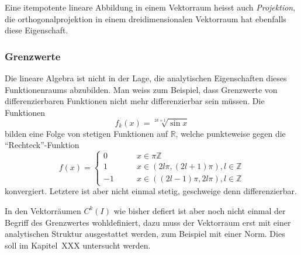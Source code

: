 Eine itempotente lineare Abbildung in einem Vektorraum heisst auch
{\em Projektion},
%
die orthogonalprojektion in einem dreidimensionalen Vektorraum hat
ebenfalls diese Eigenschaft.

\subsubsection{Grenzwerte}
Die lineare Algebra ist nicht in der Lage, die analytischen Eigenschaften
dieses Funktionenraums abzubilden.
Man weiss zum Beispiel, dass Grenzwerte von differenzierbaren Funktionen
nicht mehr differenzierbar sein müssen.
Die Funktionen 
\[
f_k(x) = \sqrt[2k+1]{\sin x}
\]
bilden eine Folge von stetigen Funktionen auf $\mathbb R$, welche
punkteweise gegen die ``Rechteck''-Funktion
\[
f(x)=\begin{cases}
 0&\qquad x\in \pi\mathbb Z \\
 1&\qquad x\in (2l\pi, (2l+1)\pi), l\in\mathbb Z\\
-1&\qquad x\in ((2l-1)\pi, 2l\pi), l\in\mathbb Z
\end{cases}
\]
konvergiert.
Letztere ist aber nicht einmal stetig, geschweige denn differenzierbar.

In den Vektorräumen $C^k(I)$ wie bisher defiert ist aber noch nicht
einmal der Begriff des Grenzwertes wohldefiniert, dazu muss der
Vektorraum erst mit einer analytischen Struktur ausgestattet werden,
zum Beispiel mit einer Norm.
Dies soll im Kapitel~XXX untersucht werden.

